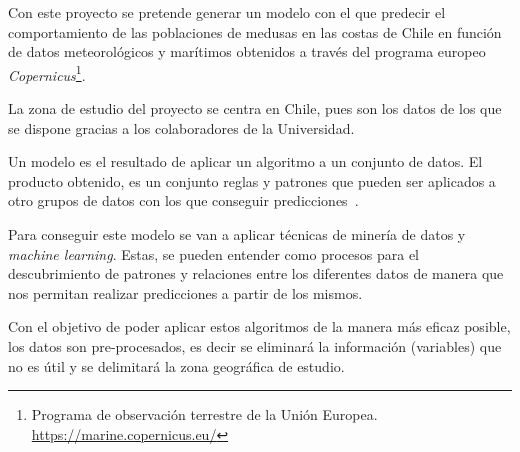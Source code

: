 Con este proyecto se pretende generar un modelo con el que predecir el comportamiento de las poblaciones de medusas en las costas de Chile en función de datos meteorológicos y marítimos obtenidos a través del programa europeo \emph{Copernicus}\footnote{Programa de observación terrestre de la Unión Europea. \url{https://marine.copernicus.eu/}}. 

La zona de estudio del proyecto se centra en Chile, pues son los datos de los que se dispone gracias a los colaboradores de la Universidad.

Un modelo es el resultado de aplicar un algoritmo a un conjunto de datos. El producto obtenido, es un conjunto reglas y patrones que pueden ser aplicados a otro grupos de datos con los que conseguir predicciones~\cite{modelo_definicion}.

Para conseguir este modelo se van a aplicar técnicas de minería de datos y \emph{machine learning}. Estas, se pueden entender como procesos para el descubrimiento de patrones y relaciones entre los diferentes datos de manera que nos permitan realizar predicciones a partir de los mismos.

Con el objetivo de poder aplicar estos algoritmos de la manera más eficaz posible, los datos son pre-procesados, es decir se eliminará la información (variables) que no es útil y se delimitará la zona geográfica de estudio. 


